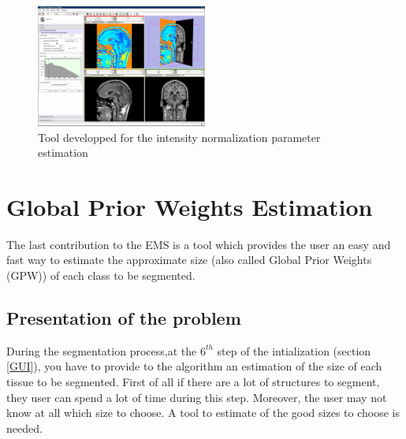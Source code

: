 \begin{figure}\centering
  \includegraphics[width=0.5\textwidth]{Images/Screenshots/intensityNormalization.png}
  \caption{Tool developped for the intensity normalization parameter estimation}\label{fig:intensitynormalization2}
\end{figure}
%


\section{Global Prior Weights Estimation}\label{GPSPDGSPGS}

The last contribution to the EMS is a tool which provides the user an easy and fast way to estimate the approximate size (also called Global Prior Weights (GPW)) of each class to be segmented.

\subsection{Presentation of the problem}
During the segmentation process,at the $6^{th}$ step of the intialization (section \ref{GUI}), you have to provide to the algorithm an estimation of the size of each tissue to be segmented. 
First of all if there are a lot of structures to segment, they user can spend a lot of time during this step. Moreover, the user may not know at all which size to choose. A tool to estimate of the good sizes to choose is needed. 
